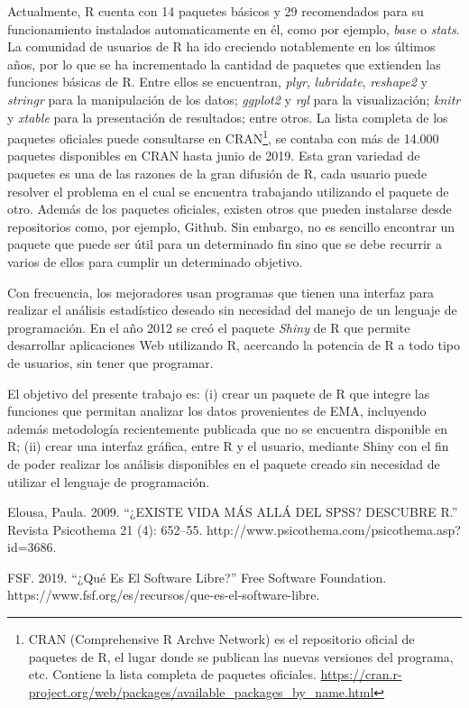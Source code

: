 Actualmente, R cuenta con 14 paquetes básicos y 29 recomendados para su funcionamiento instalados automaticamente en él, como por ejemplo, \emph{base} o \emph{stats}. La comunidad de usuarios de R ha ido creciendo notablemente en los últimos años, por lo que se ha incrementado la cantidad de paquetes que extienden las funciones básicas de R. Entre ellos se encuentran, \emph{plyr}, \emph{lubridate}, \emph{reshape2} y \emph{stringr} para la manipulación de los datos; \emph{ggplot2} y \emph{rgl} para la visualización; \emph{knitr} y \emph{xtable} para la presentación de resultados; entre otros. La lista completa de los paquetes oficiales puede consultarse en CRAN\footnote{CRAN (Comprehensive R Archve Network) es el repositorio oficial de paquetes de R, el lugar donde se publican las nuevas versiones del programa, etc. Contiene la lista completa de paquetes oficiales. \url{https://cran.r-project.org/web/packages/available_packages_by_name.html}}, se contaba con más de 14.000 paquetes disponibles en CRAN hasta junio de 2019. Esta gran variedad de paquetes es una de las razones de la gran difusión de R, cada usuario puede resolver el problema en el cual se encuentra trabajando utilizando el paquete de otro. Además de los paquetes oficiales, existen otros que pueden instalarse desde repositorios como, por ejemplo, Github. Sin embargo, no es sencillo encontrar un paquete que puede ser útil para un determinado fin sino que se debe recurrir a varios de ellos para cumplir un determinado objetivo. 

Con frecuencia, los mejoradores usan programas que tienen una interfaz para realizar el análisis estadístico deseado sin necesidad del manejo de un lenguaje de programación. En el año 2012 se creó el paquete \emph{Shiny} de R que permite desarrollar aplicaciones Web utilizando R, acercando la potencia de R a todo tipo de usuarios, sin tener que programar.

El objetivo del presente trabajo es: (i) crear un paquete de R que integre las funciones que permitan analizar los datos provenientes de EMA, incluyendo además metodología recientemente publicada que no se encuentra disponible en R; (ii) crear una interfaz gráfica, entre R y el usuario, mediante Shiny con el fin de poder realizar los análisis disponibles en el paquete creado sin necesidad de utilizar el lenguaje de programación.



Elousa, Paula. 2009. “¿EXISTE VIDA MÁS ALLÁ DEL SPSS? DESCUBRE R.” Revista Psicothema 21 (4): 652–55. http://www.psicothema.com/psicothema.asp?id=3686.

FSF. 2019. “¿Qué Es El Software Libre?” Free Software Foundation. https://www.fsf.org/es/recursos/que-es-el-software-libre.